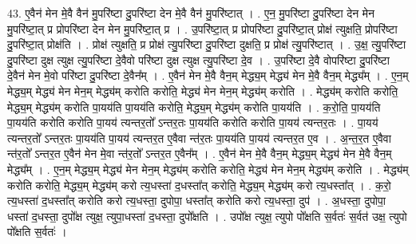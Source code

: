 \documentclass[17pt]{extarticle}
\begin{document}
43. ए॒वैन॑ मेन मे॒वै वैन॑ मु॒परि॑ष्टा दु॒परि॑ष्टा देन मे॒वै वैन॑ मु॒परि॑ष्टात् । . ए॒न॒ मु॒परि॑ष्टा दु॒परि॑ष्टा देन मेन मु॒परि॑ष्टा॒त् प्र प्रोपरि॑ष्टा देन मेन मु॒परि॑ष्टा॒त् प्र । . उ॒परि॑ष्टा॒त् प्र प्रोपरि॑ष्टा दु॒परि॑ष्टा॒त् प्रोक्ष॑ त्युक्षति॒ प्रोपरि॑ष्टा दु॒परि॑ष्टा॒त् प्रोक्ष॑ति । . प्रोक्ष॑ त्युक्षति॒ प्र प्रोक्ष॑ त्यु॒परि॑ष्टा दु॒परि॑ष्टा दुक्षति॒ प्र प्रोक्ष॑ त्यु॒परि॑ष्टात् । . उ॒क्ष॒ त्यु॒परि॑ष्टा दु॒परि॑ष्टा दुक्ष त्युक्ष त्यु॒परि॑ष्टा दे॒वैवो परि॑ष्टा दुक्ष त्युक्ष त्यु॒परि॑ष्टा दे॒व । . उ॒परि॑ष्टा दे॒वै वोपरि॑ष्टा दु॒परि॑ष्टा दे॒वैन॑ मेन मे॒वो परि॑ष्टा दु॒परि॑ष्टा दे॒वैन᳚म् । . ए॒वैन॑ मेन मे॒वै वैन॒म् मेद्ध्य॒म् मेद्ध्य॑ मेन मे॒वै वैन॒म् मेद्ध्य᳚म् । . ए॒न॒म् मेद्ध्य॒म् मेद्ध्य॑ मेन मेन॒म् मेद्ध्य॑म् करोति करोति॒ मेद्ध्य॑ मेन मेन॒म् मेद्ध्य॑म् करोति । . मेद्ध्य॑म् करोति करोति॒ मेद्ध्य॒म् मेद्ध्य॑म् करोति पा॒यय॑ति पा॒यय॑ति करोति॒ मेद्ध्य॒म् मेद्ध्य॑म् करोति पा॒यय॑ति । . क॒रो॒ति॒ पा॒यय॑ति पा॒यय॑ति करोति करोति पा॒यय॑ त्यन्तर॒तो᳚ ऽन्तर॒तः पा॒यय॑ति करोति करोति पा॒यय॑ त्यन्तर॒तः । . पा॒यय॑ त्यन्तर॒तो᳚ ऽन्तर॒तः पा॒यय॑ति पा॒यय॑ त्यन्तर॒त ए॒वैवा न्त॑र॒तः पा॒यय॑ति पा॒यय॑ त्यन्तर॒त ए॒व । . अ॒न्त॒र॒त ए॒वैवा न्त॑र॒तो᳚ ऽन्तर॒त ए॒वैन॑ मेन मे॒वा न्त॑र॒तो᳚ ऽन्तर॒त ए॒वैन᳚म् । . ए॒वैन॑ मेन मे॒वै वैन॒म् मेद्ध्य॒म् मेद्ध्य॑ मेन मे॒वै वैन॒म् मेद्ध्य᳚म् । . ए॒न॒म् मेद्ध्य॒म् मेद्ध्य॑ मेन मेन॒म् मेद्ध्य॑म् करोति करोति॒ मेद्ध्य॑ मेन मेन॒म् मेद्ध्य॑म् करोति । . मेद्ध्य॑म् करोति करोति॒ मेद्ध्य॒म् मेद्ध्य॑म् करो त्य॒धस्ता॑ द॒धस्ता᳚त् करोति॒ मेद्ध्य॒म् मेद्ध्य॑म् करो त्य॒धस्ता᳚त् । . क॒रो॒ त्य॒धस्ता॑ द॒धस्ता᳚त् करोति करो त्य॒धस्ता॒ दुपोपा॒ धस्ता᳚त् करोति करो त्य॒धस्ता॒ दुप॑ । . अ॒धस्ता॒ दुपोपा॒ धस्ता॑ द॒धस्ता॒ दुपो᳚क्ष त्युक्ष॒ त्युपा॒धस्ता॑ द॒धस्ता॒ दुपो᳚क्षति । . उपो᳚क्ष त्युक्ष॒ त्युपो पो᳚क्षति स॒र्वतः॑ स॒र्वत॑ उक्ष॒ त्युपो पो᳚क्षति स॒र्वतः॑ । \newline
\end{document}
